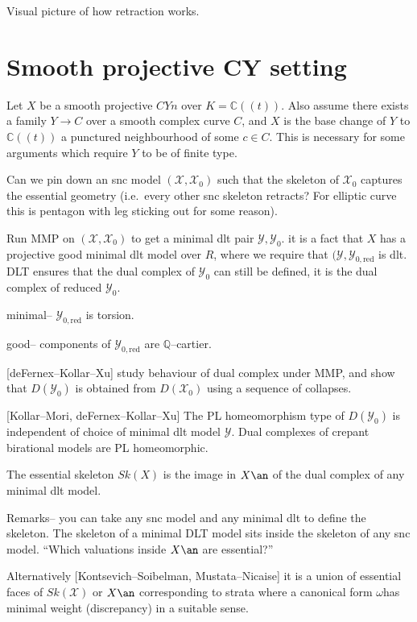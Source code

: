 Visual picture of how retraction works.

\section{Smooth projective CY setting}
Let \(X\) be a smooth projective \(CYn\) over \(K=\mathbb{C}(\!(t)\!)\). Also
assume there exists a family \(Y\to C\) over a smooth complex curve
\(C\), and \(X\) is the base change of \(Y\) to \(\mathbb{C}((t))\) a punctured
neighbourhood of some \(c\in C\). This is necessary for some arguments  which
require \(Y\) to be of finite type.

Can we pin down an snc model \((\mathcal{X},\mathcal{X}_0)\) such that the
skeleton of \(\mathcal{X}_0\) captures the essential geometry (i.e.\ every other
snc skeleton retracts? For elliptic curve this is pentagon with leg sticking out
for some reason).

Run MMP on \((\mathcal{X},\mathcal{X}_0)\) to get a minimal dlt pair
\(\mathcal{Y},\mathcal{Y}_0\). it is a fact that \(X\) has a projective good
minimal dlt model over \(R\), where we require that
\((\mathcal{Y},\mathcal{Y}_{0,\text{red}}\) is dlt. DLT ensures that the dual
complex of \(\mathcal{Y}_0\) can still be defined, it is the dual complex of
reduced \(\mathcal{Y}_0\).

minimal-- \(\mathcal{Y}_{0,\text{red}}\) is torsion.

good-- components of \(\mathcal{Y}_{0,\text{red}}\) are \(\mathbb{Q}\)--cartier.

[deFernex--Kollar--Xu] study behaviour of dual complex under MMP, and show that
\(D(\mathcal{Y}_0)\) is obtained from \(D(\mathcal{X}_0)\) using a sequence of
collapses.

[Kollar--Mori, deFernex--Kollar--Xu] The PL homeomorphism type of
\(D(\mathcal{Y}_0)\) is independent of choice of minimal dlt model
\(\mathcal{Y}\). Dual complexes of crepant birational models are PL
homeomorphic.

\begin{definition}
The essential skeleton \(Sk(X)\) is the image in \(X\an\) of the dual complex of
any minimal dlt model.
\end{definition}

Remarks-- you can take any snc model and any minimal dlt to define the skeleton.
The skeleton of a minimal DLT model sits inside the skeleton of any snc model.
``Which valuations inside \(X\an\) are essential?''

Alternatively [Kontsevich--Soibelman, Mustata--Nicaise] it is a union of
essential faces of \(Sk(\mathcal{X})\) or \(X\an\) corresponding to strata where
a canonical form \(\omega\)has minimal weight (discrepancy) in a suitable sense.

